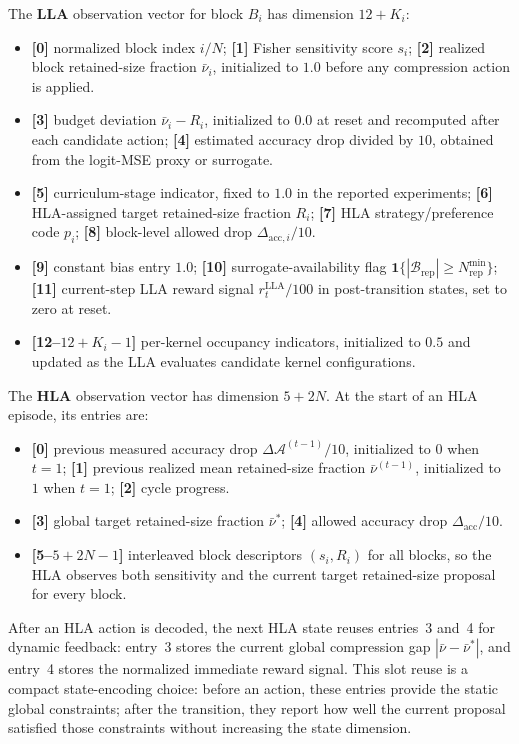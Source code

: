 \documentclass[preprint,12pt,authoryear]{elsarticle}
\begin{document}
The \textbf{LLA} observation vector for block $B_i$ has dimension $12 + K_i$:
\begin{itemize}[leftmargin=*]
    \item \textbf{[0]} normalized block index $i/N$; \textbf{[1]} Fisher sensitivity
    score $s_i$; \textbf{[2]} realized block retained-size fraction $\bar{\nu}_i$, initialized
    to $1.0$ before any compression action is applied.
    \item \textbf{[3]} budget deviation $\bar{\nu}_i - R_i$, initialized to $0.0$ at
    reset and recomputed after each candidate action; \textbf{[4]} estimated accuracy
    drop divided by $10$, obtained from the logit-MSE proxy or surrogate.
    \item \textbf{[5]} curriculum-stage indicator, fixed to $1.0$ in the reported
    experiments; \textbf{[6]} HLA-assigned target retained-size fraction $R_i$; \textbf{[7]}
    HLA strategy/preference code $p_i$; \textbf{[8]} block-level allowed drop
    $\Delta_{\mathrm{acc},i}/10$.
    \item \textbf{[9]} constant bias entry $1.0$; \textbf{[10]} surrogate-availability
    flag $\mathbf{1}\{|\mathcal{B}_{\mathrm{rep}}| \geq N_{\mathrm{rep}}^{\min}\}$;
    \textbf{[11]} current-step LLA reward signal $r_t^{\mathrm{LLA}}/100$ in post-transition states, set
    to zero at reset.
    \item \textbf{[12--$12+K_i-1$]} per-kernel occupancy indicators, initialized to
    $0.5$ and updated as the LLA evaluates candidate kernel configurations.
\end{itemize}

The \textbf{HLA} observation vector has dimension $5 + 2N$. At the start of an HLA
episode, its entries are:
\begin{itemize}[leftmargin=*]
    \item \textbf{[0]} previous measured accuracy drop $\Delta\mathcal{A}^{(t-1)}/10$,
    initialized to $0$ when $t=1$; \textbf{[1]} previous realized mean retained-size
    fraction $\bar{\nu}^{(t-1)}$, initialized to $1$ when $t=1$; \textbf{[2]} cycle progress.
    \item \textbf{[3]} global target retained-size fraction $\bar{\nu}^*$; \textbf{[4]} allowed
    accuracy drop $\Delta_{\mathrm{acc}}/10$.
    \item \textbf{[5--$5+2N-1$]} interleaved block descriptors $(s_i,R_i)$ for all
    blocks, so the HLA observes both sensitivity and the current target retained-size proposal
    for every block.
\end{itemize}
After an HLA action is decoded, the next HLA state reuses entries~3 and~4 for dynamic
feedback: entry~3 stores the current global compression gap
$|\bar{\nu}-\bar{\nu}^*|$, and entry~4 stores the normalized immediate reward signal.
This slot reuse is a compact state-encoding choice: before an action, these entries
provide the static global constraints; after the transition, they report how well the
current proposal satisfied those constraints without increasing the state dimension.
\end{document}
